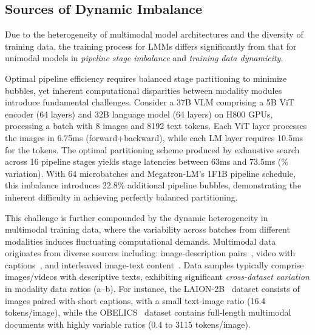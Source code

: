 \subsection{Sources of Dynamic Imbalance}
\label{section:dynamic-imbalance}

Due to the heterogeneity of multimodal model architectures and the diversity of training data,
the training process for LMMs differs significantly from that for unimodal models in
\emph{pipeline stage imbalance} and \emph{training data dynamicity}.

Optimal pipeline efficiency requires balanced stage partitioning to minimize bubbles, yet inherent computational disparities between modality modules introduce fundamental challenges.
Consider a 37B VLM comprising a 5B ViT encoder (64 layers) and 32B language model (64 layers) on H800 GPUs,
processing a batch with 8 images and 8192 text tokens.
Each ViT layer processes the images in 6.75ms (forward+backward), while each LM layer requires 10.5ms for the tokens.
The optimal partitioning scheme produced by exhaustive search across 16 pipeline stages yields stage latencies between 63ms and 73.5ms (\% variation).
With 64 microbatches and Megatron-LM's 1F1B pipeline schedule, this imbalance introduces 22.8\% additional pipeline bubbles, demonstrating the inherent difficulty in achieving perfectly balanced partitioning.

This challenge is further compounded by the dynamic heterogeneity in multimodal training data,
where the variability across batches from different modalities induces fluctuating computational demands.
Multimodal data originates from diverse sources including:
image-description pairs~\cite{laion5b-nips22,coyo-700m},
video with captions~\cite{share-gpt4-video-arxiv24,internvid-arxiv23,mmtrail-arxiv24,msr-vtt-cvpr16}, and
interleaved image-text content~\cite{obelics-arxiv23,mmc4-arxiv23}.
Data samples typically comprise images/videos with descriptive texts, exhibiting significant \emph{cross-dataset variation} in modality data ratios (a--b).
For instance,
the LAION-2B~\cite{laion5b-nips22} dataset consists of images paired with short captions, with a small text-image ratio (16.4 tokens/image), while the OBELICS~\cite{obelics-arxiv23} dataset contains full-length multimodal documents
with highly variable ratios (0.4 to 3115 tokens/image).

